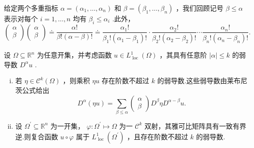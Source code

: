 给定两个多重指标 $\alpha  = \left( {{\alpha }_{1},\ldots ,{\alpha }_{n}}\right)$ 和 $\beta  = \left( {{\beta }_{1},\ldots ,{\beta }_{n}}\right)$ ，我们回顾记号 $\beta  \leq  \alpha$ 表示对每个 $i = 1,\ldots ,n$ 均有 ${\beta }_{i} \leq  {\alpha }_{i}$ .此外，
\[
\begin{pmatrix}\alpha\\ \beta \end{pmatrix}\begin{pmatrix}\alpha\\ \beta \end{pmatrix}  \doteq  \frac{\alpha !}{\beta !\left( {\alpha  - \beta }\right) !} \doteq  \frac{{\alpha }_{1}!}{{\beta }_{1}!\left( {{\alpha }_{1} - {\beta }_{1}}\right) !} \cdot  \frac{{\alpha }_{2}!}{{\beta }_{2}!\left( {{\alpha }_{2} - {\beta }_{2}}\right) !}\cdots \frac{{\alpha }_{n}!}{{\beta }_{n}!\left( {{\alpha }_{n} - {\beta }_{n}}\right) !}.
\]
    
\begin{lemma}[弱可微函数的乘积与复合]\label{lem:weakly-differentiable-product-composition}
设 $\Omega  \subseteq  {\mathbb{R}}^{n}$ 为任意开集，并考虑函数 $u \in  {L}_{\text{ loc }}^{1}\left( \Omega \right)$ ，其具有任意阶 $\left| \alpha \right|  \leq  k$ 的弱导数 ${D}^{\alpha }u$ .
\begin{enumerate}[(i)]
    \item 若 $\eta  \in  {\mathcal{C}}^{k}\left( \Omega \right)$ ，则乘积 ${\eta u}$ 存在阶数不超过 $k$ 的弱导数.这些弱导数由莱布尼茨公式给出
\begin{equation}\tag{8.18}\label{eq:weak-leibniz}
{D}^{\alpha }\left( {\eta u}\right)  = \sum_{{\beta  \leq  \alpha }}\begin{pmatrix}\alpha\\ \beta \end{pmatrix} {D}^{\beta }\eta {D}^{\alpha  - \beta }u.
\end{equation}
    \item 设 ${\Omega }^{\prime } \subseteq  {\mathbb{R}}^{n}$ 为一开集， $\varphi  : {\Omega }^{\prime } \mapsto  \Omega$ 为一 ${\mathcal{C}}^{k}$ 双射，其雅可比矩阵具有一致有界逆.则复合函数 $u \circ  \varphi$ 属于 ${L}_{\text{ loc }}^{1}\left( {\Omega }^{\prime }\right)$ ，且存在阶数不超过 $k$ 的弱导数.
\end{enumerate}
\end{lemma}

